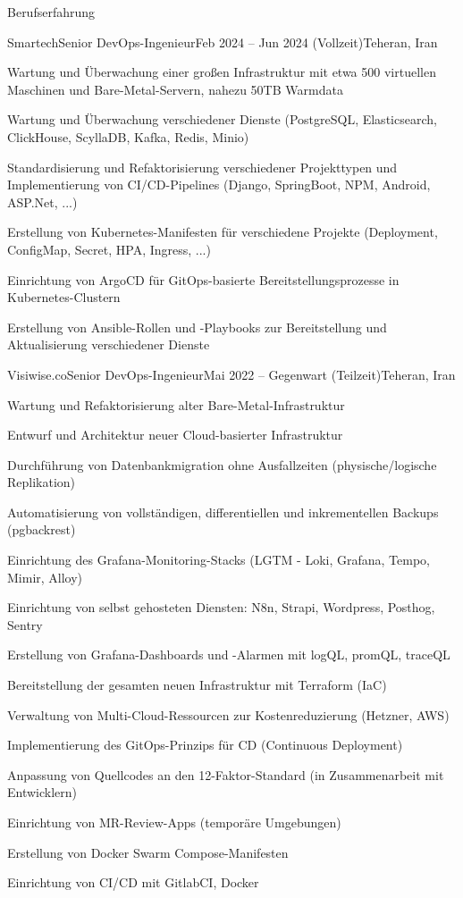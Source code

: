 \documentclass[]{main}
\begin{document}
\begin{section}{Berufserfahrung}
 \begin{subsection}{Smartech}{Senior DevOps-Ingenieur}{Feb 2024 -- Jun 2024 (Vollzeit)}{Teheran, Iran}
     \item Wartung und Überwachung einer großen Infrastruktur mit etwa 500 virtuellen Maschinen und Bare-Metal-Servern, nahezu 50TB Warmdata
     \item Wartung und Überwachung verschiedener Dienste (PostgreSQL, Elasticsearch, ClickHouse, ScyllaDB, Kafka, Redis, Minio)
     \item Standardisierung und Refaktorisierung verschiedener Projekttypen und Implementierung von CI/CD-Pipelines (Django, SpringBoot, NPM, Android, ASP.Net, ...)
     \item Erstellung von Kubernetes-Manifesten für verschiedene Projekte (Deployment, ConfigMap, Secret, HPA, Ingress, ...)
     \item Einrichtung von ArgoCD für GitOps-basierte Bereitstellungsprozesse in Kubernetes-Clustern
     \item Erstellung von Ansible-Rollen und -Playbooks zur Bereitstellung und Aktualisierung verschiedener Dienste
 \end{subsection}

 \begin{subsection}{Visiwise.co}{Senior DevOps-Ingenieur}{Mai 2022 -- Gegenwart (Teilzeit)}{Teheran, Iran}
     \item Wartung und Refaktorisierung alter Bare-Metal-Infrastruktur
     \item Entwurf und Architektur neuer Cloud-basierter Infrastruktur
     \item Durchführung von Datenbankmigration ohne Ausfallzeiten (physische/logische Replikation)
     \item Automatisierung von vollständigen, differentiellen und inkrementellen Backups (pgbackrest)
     \item Einrichtung des Grafana-Monitoring-Stacks (LGTM - Loki, Grafana, Tempo, Mimir, Alloy)
     \item Einrichtung von selbst gehosteten Diensten: N8n, Strapi, Wordpress, Posthog, Sentry
     \item Erstellung von Grafana-Dashboards und -Alarmen mit logQL, promQL, traceQL
     \item Bereitstellung der gesamten neuen Infrastruktur mit Terraform (IaC)
     \item Verwaltung von Multi-Cloud-Ressourcen zur Kostenreduzierung (Hetzner, AWS)
     \item Implementierung des GitOps-Prinzips für CD (Continuous Deployment)
     \item Anpassung von Quellcodes an den 12-Faktor-Standard (in Zusammenarbeit mit Entwicklern)
     \item Einrichtung von MR-Review-Apps (temporäre Umgebungen)
     \item Erstellung von Docker Swarm Compose-Manifesten
     \item Einrichtung von CI/CD mit GitlabCI, Docker
 \end{subsection}


\end{section}
\end{document}
